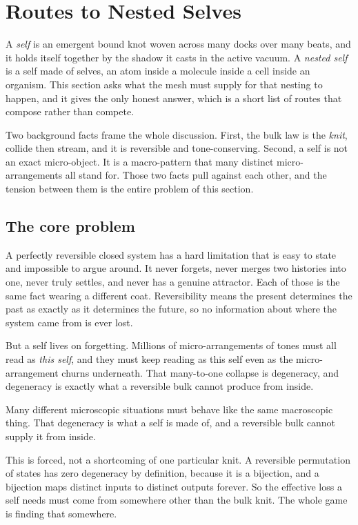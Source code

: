\section{Routes to Nested Selves}

A \emph{self} is an emergent bound knot woven across many docks over many beats, and it holds itself together by the shadow it casts in the active vacuum. A \emph{nested self} is a self made of selves, an atom inside a molecule inside a cell inside an organism. This section asks what the mesh must supply for that nesting to happen, and it gives the only honest answer, which is a short list of routes that compose rather than compete.

Two background facts frame the whole discussion. First, the bulk law is the \emph{knit}, collide then stream, and it is reversible and tone-conserving. Second, a self is not an exact micro-object. It is a macro-pattern that many distinct micro-arrangements all stand for. Those two facts pull against each other, and the tension between them is the entire problem of this section.

\subsection{The core problem}

A perfectly reversible closed system has a hard limitation that is easy to state and impossible to argue around. It never forgets, never merges two histories into one, never truly settles, and never has a genuine attractor. Each of those is the same fact wearing a different coat. Reversibility means the present determines the past as exactly as it determines the future, so no information about where the system came from is ever lost.

But a self lives on forgetting. Millions of micro-arrangements of tones must all read as \emph{this self}, and they must keep reading as this self even as the micro-arrangement churns underneath. That many-to-one collapse is degeneracy, and degeneracy is exactly what a reversible bulk cannot produce from inside.

\begin{principle}
Many different microscopic situations must behave like the same macroscopic thing. That degeneracy is what a self is made of, and a reversible bulk cannot supply it from inside.
\end{principle}

This is forced, not a shortcoming of one particular knit. A reversible permutation of states has zero degeneracy by definition, because it is a bijection, and a bijection maps distinct inputs to distinct outputs forever. So the effective loss a self needs must come from somewhere other than the bulk knit. The whole game is finding that somewhere.

